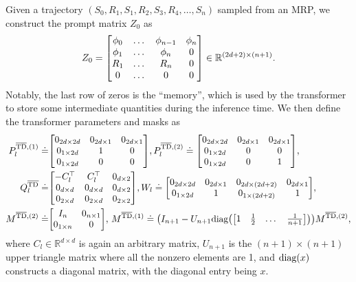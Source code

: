 \documentclass{article}
\newcommand{\R}{\mathbb{R}}
\newcommand{\bartd}{\overline{\text{TD}}}
\begin{document}
Given a trajectory $(S_0, R_1, S_1, R_2, S_3, R_4, \dots, S_n)$ sampled from an MRP,
we construct the prompt matrix $Z_0$ as
\begin{align}
    Z_0 = \mqty[\phi_0 & \dots & \phi_{n-1} & \phi_n \\
                \phi_1 & \dots & \phi_n & 0 \\
                R_1 & \dots & R_n & 0 \\
                0 & \dots & 0 & 0] \in \R^{(2d + 2) \times (n+1)}.
\end{align}
Notably, the last row of zeros is the ``memory'',
which is used by the transformer to store some intermediate quantities during the inference time.
We then define the transformer parameters and masks as
\begin{align}
    P_l^{\bartd, (1)}\doteq & \mqty[0_{2d \times 2d} & 0_{2d \times 1} & 0_{2d \times 1}\\
                       0_{1 \times 2d} & 1 & 0\\
                       0_{1\times 2d} & 0 & 0],
    P_l^{\bartd, (2)} \doteq \mqty[0_{2d \times 2d} & 0_{2d \times 1} & 0_{2d \times 1}\\
                       0_{1 \times 2d} & 0 & 0\\
                       0_{1\times 2d} & 0 & 1] \label{eq: two-head P matrices},\\
    Q^{\bartd}_l \doteq & \mqty[-C_l^\top & C_l^\top & 0_{d \times 2} \\
                       0_{d \times d} & 0_{d \times d} & 0_{d \times 2}\\
                       0_{2 \times d} & 0_{2 \times d} & 0_{2\times2}],
    W_l \doteq \mqty[0_{2d \times 2d} & 0_{2d \times 1} & 0_{2d \times (2d + 2)} & 0_{2d \times 1} \\
                     0_{1 \times 2d} & 1 & 0_{1 \times (2d+2)} & 1]\label{eq: two-head Q and W}, \\
    M^{\bartd, (2)} \doteq & \mqty[I_n & 0_{n \times 1}\\
                     0_{1 \times n} & 0], \,
    M^{\bartd, (1)} \doteq  \qty(I_{n+1} - U_{n+1} \text{diag}\qty(\mqty[1& \frac{1}{2}& \dots& \frac{1}{n+1}]))M^{\bartd, (2)}, \label{eq: two-head mask}
\end{align}
where $C_l \in \R^{d\times d}$ is again an arbitrary matrix,
$U_{n+1}$ is the $(n+1) \times (n+1)$ upper triangle matrix where all the nonzero elements are 1,
and $\text{diag}\qty(x)$ constructs a diagonal matrix, with the diagonal entry being $x$.
\end{document}

